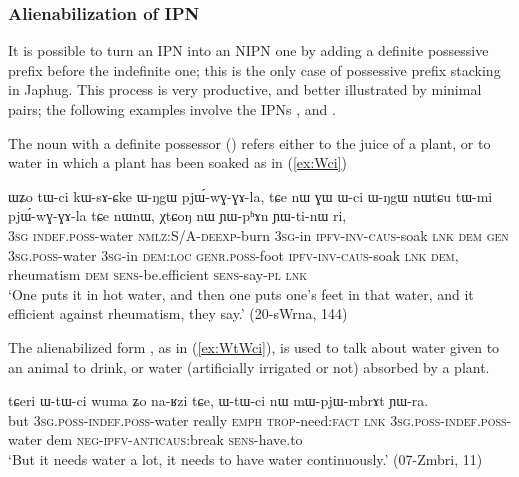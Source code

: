 \subsubsection{Alienabilization of IPN} \label{sec:alienabilization}
 It is possible to turn an IPN  into an NIPN one by adding a definite possessive prefix before the indefinite one; this is the only case of possessive prefix stacking in Japhug. This process is very productive, and better illustrated by minimal pairs; the following examples involve the IPNs ,  and .
 
The noun  with a definite possessor () refers either to the juice of a plant, or to water in which a plant has been soaked as in (\ref{ex:Wci})

  \begin{exe}
\ex \label{ex:Wci}
 \gll  ɯʑo tɯ-ci kɯ-sɤ-ɕke ɯ-ŋgɯ pjɯ́-wɣ-ɣɤ-la, tɕe nɯ ɣɯ ɯ-ci ɯ-ŋgɯ nɯtɕu tɯ-mi pjɯ́-wɣ-ɣɤ-la tɕe nɯnɯ, χtɕoŋ nɯ ɲɯ-pʰɤn ɲɯ-ti-nɯ ri, \\
\textsc{3sg}  \textsc{indef.poss}-water \textsc{nmlz}:S/A-\textsc{deexp}-burn \textsc{3sg}-in \textsc{ipfv}-\textsc{inv}-\textsc{caus}-soak \textsc{lnk} \textsc{dem} \textsc{gen} \textsc{3sg.poss}-water \textsc{3sg}-in \textsc{dem:loc}  \textsc{genr.poss}-foot  \textsc{ipfv}-\textsc{inv}-\textsc{caus}-soak \textsc{lnk} \textsc{dem}, rheumatism \textsc{dem} \textsc{sens}-be.efficient \textsc{sens}-say-\textsc{pl} \textsc{lnk}  \\
 \glt `One puts it in hot water, and then one puts one's feet in that water, and it efficient against rheumatism, they say.' (20-sWrna, 144)
 \end{exe}

The alienabilized form , as in (\ref{ex:WtWci}), is used to talk about water given to an animal to drink, or water (artificially irrigated or not) absorbed by a plant.

 \begin{exe}
\ex \label{ex:WtWci}
 \gll  tɕeri ɯ-tɯ-ci wuma ʑo na-ʁzi tɕe, ɯ-tɯ-ci nɯ mɯ-pjɯ-mbrɤt ɲɯ-ra. \\
 but \textsc{3sg.poss}-\textsc{indef.poss}-water really \textsc{emph} \textsc{trop}-need:\textsc{fact} \textsc{lnk} \textsc{3sg.poss}-\textsc{indef.poss}-water dem \textsc{neg-ipfv-anticaus}:break \textsc{sens}-have.to \\
 \glt  `But it needs water a lot, it needs to have water continuously.'  (07-Zmbri, 11)
 \end{exe}
 
